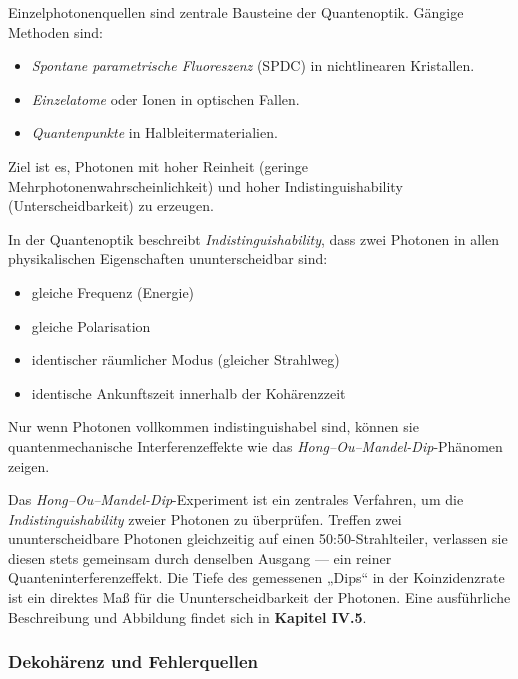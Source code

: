 Einzelphotonenquellen sind zentrale Bausteine der Quantenoptik. Gängige Methoden sind:
\begin{itemize}
	\item \emph{Spontane parametrische Fluoreszenz} (SPDC) in nichtlinearen Kristallen.
	\item \emph{Einzelatome} oder Ionen in optischen Fallen.
	\item \emph{Quantenpunkte} in Halbleitermaterialien.
\end{itemize}
Ziel ist es, Photonen mit hoher Reinheit (geringe Mehrphotonenwahrscheinlichkeit) und hoher Indistinguishability (Unterscheidbarkeit) zu erzeugen.
\vspace{1em}
\begin{tcolorbox}[hinweisbox, title=Was bedeutet „Indistinguishability“? \label{box:indistinguishability}]
	\small
	In der Quantenoptik beschreibt \emph{Indistinguishability}, dass zwei Photonen in allen physikalischen Eigenschaften ununterscheidbar sind:
	\begin{itemize}
		\item gleiche Frequenz (Energie)
		\item gleiche Polarisation
		\item identischer räumlicher Modus (gleicher Strahlweg)
		\item identische Ankunftszeit innerhalb der Kohärenzzeit
	\end{itemize}
	Nur wenn Photonen vollkommen indistinguishabel sind, können sie quantenmechanische Interferenzeffekte wie das \emph{Hong–Ou–Mandel-Dip}-Phänomen zeigen.
\end{tcolorbox}
\vspace{1em}
\begin{tcolorbox}[physikbox, title=Das Hong–Ou–Mandel-Dip-Phänomen \label{box:hong_ou_mandel}]
	\small
	Das \emph{Hong–Ou–Mandel-Dip}-Experiment ist ein zentrales Verfahren, um die \emph{Indistinguishability} zweier Photonen zu überprüfen. Treffen zwei ununterscheidbare Photonen gleichzeitig auf einen 50:50-Strahlteiler, verlassen sie diesen stets gemeinsam durch denselben Ausgang — ein reiner Quanteninterferenzeffekt.  
	Die Tiefe des gemessenen „Dips“ in der Koinzidenzrate ist ein direktes Maß für die Ununterscheidbarkeit der Photonen.  
	Eine ausführliche Beschreibung und Abbildung findet sich in \textbf{Kapitel IV.5}.
\end{tcolorbox}

\subsubsection{Dekohärenz und Fehlerquellen}

